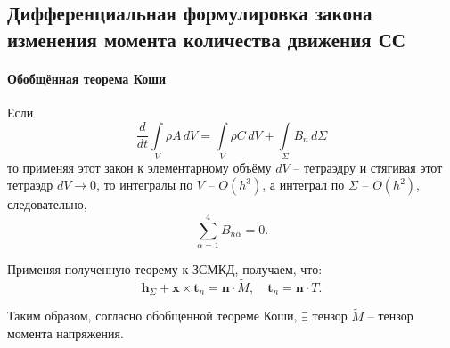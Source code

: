 \subsection{Дифференциальная формулировка закона изменения момента количества движения СС}  

\paragraph{Обобщённая теорема Коши}
Если
\[
  \dfrac{d}{dt} \int\limits_V \rho A \, dV 
  = \int\limits_V \rho C \, dV + \int\limits_\Sigma B_n \, d\Sigma
\]
то применяя этот закон к элементарному объёму $dV$ -- тетраэдру и стягивая этот
тетраэдр $dV \to 0$, то интегралы по $V$ -- $O(h^3)$, а интеграл по $\Sigma$ -- $O(h^2)$,
следовательно, 
\[
  \sum_{\alpha=1}^4 B_{n\alpha} = 0.
\]

Применяя полученную теорему к ЗСМКД, получаем, что:
\[
  \mathbf{h}_\Sigma + \mathbf{x} \times \mathbf{t}_n = \mathbf{n} \cdot \tilde M, \quad
  \mathbf{t}_n = \mathbf{n} \cdot T.
\]

Таким образом, согласно обобщенной теореме Коши, $\exists$ тензор $\tilde M$ -- тензор момента напряжения.
